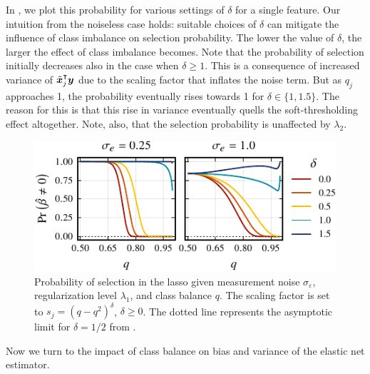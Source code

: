 In , we plot this probability for various settings of
\(\delta\) for a single feature. Our intuition from the noiseless case holds: suitable
choices of \(\delta\) can mitigate the influence of class imbalance on selection
probability. The lower the value of \(\delta\), the larger the effect of class imbalance
becomes. Note that the probability of selection initially decreases also in the case when
\(\delta \geq 1\). This is a consequence of increased variance of \(\tilde{\boldsymbol{x}}_j^\intercal
\boldsymbol{y}\) due to the scaling factor that inflates the noise term. But as \(q_j\) approaches
1, the probability eventually rises towards 1 for \(\delta \in \{1, 1.5\}\). The reason for
this is that this rise in variance eventually quells the soft-thresholding effect
altogether. Note, also, that the selection probability is unaffected by \(\lambda_2\).

\begin{figure}[htpb]
  \centering
  \includegraphics[]{plots/selection_probability.pdf}
  \caption{%
    Probability of selection in the lasso given measurement noise
    \(\sigma_\varepsilon\), regularization level \(\lambda_1\), and class
    balance \(q\). The scaling factor is set to \(s_j = (q - q^2)^\delta\),
    \(\delta \geq 0\). The dotted line represents the asymptotic limit for
    \(\delta = 1/2\) from .
    \label{fig:selection-probability}}
\end{figure}


Now we turn to the impact of class balance on bias and variance of the elastic net
estimator.

